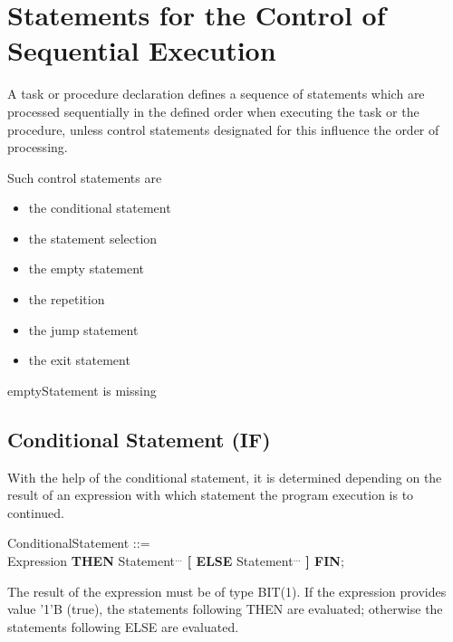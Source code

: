 
\chapter{Statements for the Control of Sequential Execution}   %

A task or procedure declaration defines a sequence of statements which
are processed sequentially in the defined order when executing the task or
the procedure, unless control statements designated for this influence the
order of processing.

Such control statements are
\begin{itemize}
\item the conditional statement
\item the statement selection
\item the empty statement
\item the repetition
\item the jump statement
\item the exit statement
\end{itemize}

\begin{grammar}

\end{grammar}
\begin{discuss}
emptyStatement is missing
\end{discuss}

\section{Conditional Statement (IF)}   %

With the help of the conditional statement, it is determined depending
on the result of an expression with which statement the program
execution is to continued.

\begin{front}
ConditionalStatement ::=\\
 Expression {\bf THEN} Statement$^{...}$ {\bf [ ELSE} Statement$^{...}$ {\bf ] FIN};
\end{front}
\begin{grammar}

\end{grammar}
The result of the expression must be of type BIT(1). If the expression
provides value '1'B (true), the statements following THEN are evaluated;
otherwise the statements following ELSE are evaluated.

